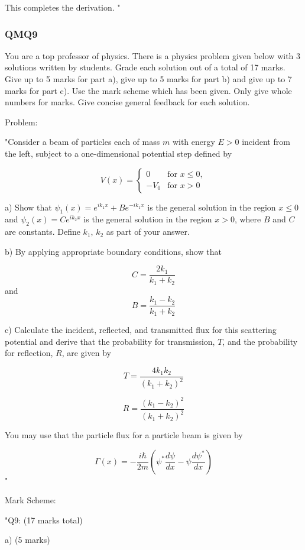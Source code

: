 This completes the derivation.
"

\subsubsection{QMQ9}

You are a top professor of physics. There is a physics problem given below with 3 solutions written by students. Grade each solution out of a total of 17 marks. Give up to 5 marks for part a), give up to 5 marks for part b) and give up to 7 marks for part c). Use the mark scheme which has been given. Only give whole numbers for marks. Give concise general feedback for each solution. 

Problem:

"Consider a beam of particles each of mass \( m \) with energy \( E > 0 \) incident from the left, subject to a one-dimensional potential step defined by

\[ V(x) = \begin{cases}
0 & \text{for } x \leq 0,\\
-V_{0}  & \text{for } x > 0 
\end{cases} \]

a) Show that \( \psi_{1}(x) = e^{ik_{1}x} + Be^{-ik_{1}x} \) is the general solution in the region \( x \leq 0 \) and \( \psi_{2}(x) = Ce^{ik_{2}x} \) is the general solution in the region \( x > 0 \), where \( B \) and \( C \) are constants. Define \( k_{1} \), \( k_{2} \) as part of your answer.

b) By applying appropriate boundary conditions, show that 

\[ C = \frac{2k_{1}}{k_{1}+k_{2}} \] and \[ B = \frac{k_{1}-k_{2}}{k_{1}+k_{2}} \]

c) Calculate the incident, reflected, and transmitted flux for this scattering potential and derive that the probability for transmission, \( T \), and the probability for reflection, \( R \), are given by 

\[ T = \frac{4k_{1}k_{2}}{(k_{1}+k_{2})^{2}} \]

\[ R = \frac{(k_{1}-k_{2})^{2}}{(k_{1}+k_{2})^{2}} \]

You may use that the particle flux for a particle beam is given by 

\[ \Gamma(x) = -\frac{i\hbar}{2m} \left(\psi^{*}\frac{d\psi}{dx} - \psi\frac{d\psi^{*}}{dx} \right) \]"

Mark Scheme:

"{Q9: (17 marks total) }

a) (5 marks)

